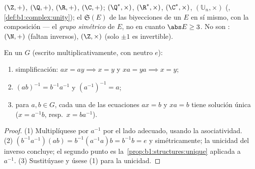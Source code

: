 \begin{example}\label{ex:b1:structures:groups}
$(\Z, +)$, $(\Q, +)$, $(\R, +)$, $(\C, +)$; $(\Q^*, \times)$,
$(\R^*, \times)$, $(\C^*, \times)$, $(\mathbb{U}_n, \times)$ (, \cref{def:b1:complex:unity}); el  $\mathfrak{S}(E)$ de
las biyecciones de un  $E$ en sí mismo, con la composición ---
el \emph{grupo simétrico} de $E$, no  en
cuanto $\abs E \geq 3$. No son : $(\N, +)$ (faltan inversos),
$(\Z, \times)$ (solo $\pm 1$ es invertible).
\end{example}

\begin{proposition}\label{prop:b1:structures:rules}
En un  $G$ (escrito multiplicativamente, con neutro $e$):
\begin{enumerate}
  \item simplificación: $ax = ay \implies x = y$ y $xa = ya \implies
        x = y$;
  \item $(ab)^{-1} = b^{-1} a^{-1}$ y $(a^{-1})^{-1} = a$;
  \item para $a, b \in G$, cada una de las ecuaciones $ax = b$ y $xa = b$
        tiene solución única ($x = a^{-1}b$, resp.\ $x = b a^{-1}$).
\end{enumerate}
\end{proposition}

\begin{proof}
(1) Multiplíquese por $a^{-1}$ por el lado adecuado, usando la
asociatividad. (2) $(b^{-1}a^{-1})(ab) = b^{-1}(a^{-1}a)b = b^{-1}b =
e$ y simétricamente; la unicidad del inverso concluye; el segundo punto
es la~\cref{prop:b1:structures:unique} aplicada a $a^{-1}$. (3)
Sustitúyase y úsese (1) para la unicidad.
\end{proof}

